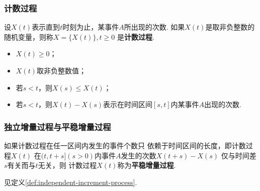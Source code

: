 \setcounter{footnote}{0}

\begin{frame}
    \frametitle{计数过程}
    \begin{mydefinition}[计数过程]
        设$X(t)$表示直到$t$时刻为止，某事件$A$所出现的次数. 
        如果$X(t)$是取非负整数的随机变量，则称$X=\{X(t)\},t\geqslant 0$
        是\textbf{计数过程}. 
    \end{mydefinition}
    \begin{myproposition}
        \begin{itemize}
            \item $X(t)\geqslant0$；
            \item $X(t)$取非负整数值；
            \item 若$s<t$，则$X(s)\leqslant X(t)$；
            \item 若$s<t$，则$X(t)-X(s)$表示在时间区间$[s,t]$内某事件$A$出现的次数. 
        \end{itemize}
    \end{myproposition}
\end{frame}

\begin{frame}
    \frametitle{独立增量过程与平稳增量过程}
    \begin{mydefinition}[平稳增量过程]
        如果计数过程在任一区间内发生的事件个数只
        依赖于时间区间的长度，即计数过程$X(t)$
        在$(t,t+s](s>0)$内事件$A$发生的次数$X(t+s)-X(s)$
        仅与时间差$s$有关而与$t$无关，则
        计数过程$X(t)$称为\textbf{平稳增量过程}. 
    \end{mydefinition}
    \begin{mydefinition}[独立增量过程]
        见定义\ref{def:independent-increment-process}.
    \end{mydefinition}
\end{frame}

